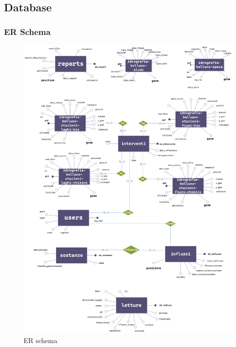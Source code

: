 \subsection{Database}
\subsubsection{ER Schema}
\begin{figure}[H] \centering \includegraphics[width=39em]{img/ERSchema.png}  \caption{ER schema} \label{er} \end{figure}

